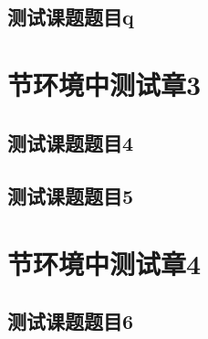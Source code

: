 \documentclass[color=green]{textbook-cn}%
\begin{document}
\begin{Project}

\makeatletter

\section{测试课题题目q}


\chapter{节环境中测试章3}


\section{测试课题题目4}


\begin{Case}
	\item\lipsum[1][1]
	\item\lipsum[1][1]
	\item\lipsum[1][1]
	\item\lipsum[1][1]
\end{Case}


\begin{Definition}[定义名称]
	
	\lipsum[1]
\end{Definition}











\section{测试课题题目5}

\begin{Definition}[定义名称]
\lipsum[1]
\end{Definition}


\chapter{节环境中测试章4}


\section{测试课题题目6}


\lipsum[2]

\begin{Definition}[定义名称]
\lipsum[1]
\end{Definition}


\end{Project}
\end{document}
